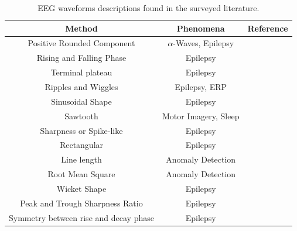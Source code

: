 \documentclass[brainsci,article,submit,moreauthors,pdftex,10pt,a4paper]{mdpi}
\begin{document}



\begin{table}[H]
\caption{EEG waveforms descriptions found in the surveyed literature.}
\centering
\begin{tabular}{ccc}
\toprule
\textbf{Method}	& \textbf{Phenomena} & \textbf{Reference}	\\
\midrule
Positive Rounded Component                    & $\alpha$-Waves, Epilepsy & \citep{Schomer2010,Tatum2008} \\
Rising and Falling Phase      & Epilepsy &  \citep{Thakor2004,Tatum2008} \\
Terminal plateau      & Epilepsy &  \citep{Thakor2004} \\
Ripples and Wiggles     & Epilepsy, ERP &  \citep{EEGIntro, Thakor2004,Cacioppo2007,Kappenman2012} \\
Sinusoidal Shape        & Epilepsy &  \citep{Cacioppo2007,Tatum2008,Ouyang2017,Kappenman2012,Cole2017} \\
Sawtooth                     & Motor Imagery, Sleep &  \citep{EEGIntro,Rodenbeck2006,Tatum2008} \\
Sharpness or Spike-like     & Epilepsy &  \citep{Thakor2004,Hartman2005,Sanei2007,EEGIntro} \\
Rectangular     & Epilepsy &  \citep{Thakor2004,Cole2017} \\
Line length       & Anomaly Detection & \citep{Wulsin2011} \\
Root Mean Square & Anomaly Detection & \citep{Wulsin2011} \\
Wicket Shape     & Epilepsy &  \citep{EEGIntro,Hartman2005,Sanei2007,Tatum2008,Schomer2010,Cole2017} \\
Peak and Trough Sharpness Ratio     & Epilepsy &  \citep{Hartman2005,Sanei2007,Lawrence2010,Cole2017} \\
Symmetry between rise and decay phase     & Epilepsy &  \citep{Hartman2005,Cole2017} \\

\end{tabular}
\end{table}
\end{document}
